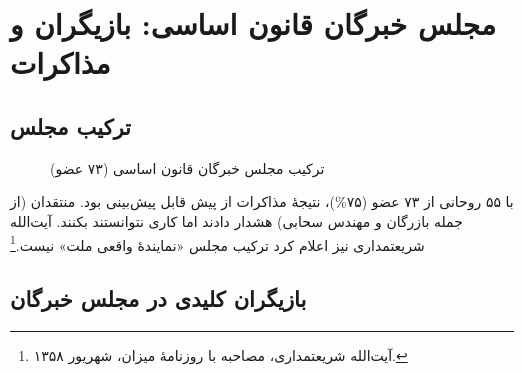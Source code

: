 \section{مجلس خبرگان قانون اساسی: بازیگران و مذاکرات}

\subsection{ترکیب مجلس}

\begin{figure}[H]
\centering
{}
\caption{ترکیب مجلس خبرگان قانون اساسی (۷۳ عضو)}
\label{fig:experts-composition}
\end{figure}

\begin{warningBox}
با ۵۵ روحانی از ۷۳ عضو (۷۵\%)، نتیجهٔ مذاکرات از پیش قابل پیش‌بینی بود. منتقدان (از جمله بازرگان و مهندس سحابی) هشدار دادند اما کاری نتوانستند بکنند. آیت‌الله شریعتمداری نیز اعلام کرد ترکیب مجلس «نمایندهٔ واقعی ملت» نیست.\footnote{آیت‌الله شریعتمداری، مصاحبه با روزنامهٔ میزان، شهریور ۱۳۵۸.}
\end{warningBox}

\subsection{بازیگران کلیدی در مجلس خبرگان}

